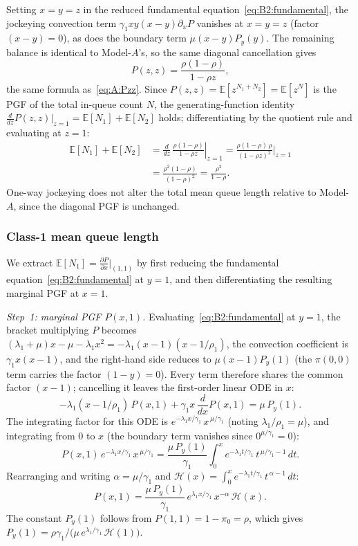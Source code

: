 \documentclass{article}
\numberwithin{equation}{section}
\begin{document}
Setting $x=y=z$ in the reduced fundamental equation~\eqref{eq:B2:fundamental}, the
jockeying convection term $\gamma_1 xy(x-y)\partial_xP$ vanishes at $x=y=z$
(factor $(x-y)=0$), as does the boundary term $\mu(x-y)P_y(y)$.  The remaining
balance is identical to Model-$A$'s, so the same diagonal cancellation gives
\[
    P(z,z) = \frac{\rho(1-\rho)}{1-\rho z},
\]
the same formula as~\eqref{eq:A:Pzz}.  Since $P(z,z)=\mathbb{E}[z^{N_1+N_2}]=\mathbb{E}[z^{N}]$
is the PGF of the total in-queue count $N$, the generating-function identity
$\tfrac{d}{dz}P(z,z)\big|_{z=1}=\mathbb{E}[N_1]+\mathbb{E}[N_2]$ holds;
differentiating by the quotient rule and evaluating at $z=1$:
\begin{align*}
    \mathbb{E}[N_1]+\mathbb{E}[N_2]
    &= \left.\frac{d}{dz}\,\frac{\rho(1-\rho)}{1-\rho z}\right|_{z=1}
     = \frac{\rho(1-\rho)\,\rho}{(1-\rho z)^2}\bigg|_{z=1} \\
    &= \frac{\rho^2(1-\rho)}{(1-\rho)^2}
     = \frac{\rho^2}{1-\rho}.
\end{align*}
One-way jockeying does not alter the total mean queue length relative to
Model-$A$, since the diagonal PGF is unchanged.

\subsubsection*{Class-1 mean queue length}

We extract $\mathbb{E}[N_1]=\tfrac{\partial P}{\partial x}\big|_{(1,1)}$ by first
reducing the fundamental equation~\eqref{eq:B2:fundamental} at $y=1$, and then
differentiating the resulting marginal PGF at $x=1$.

\medskip\noindent\textit{Step~1: marginal PGF $P(x,1)$.}\enspace
Evaluating~\eqref{eq:B2:fundamental} at $y=1$, the bracket multiplying $P$ becomes
$(\lambda_1+\mu)x-\mu-\lambda_1 x^2=-\lambda_1(x-1)(x-1/\rho_1)$, the convection
coefficient is $\gamma_1 x(x-1)$, and the right-hand side reduces to $\mu(x-1)P_y(1)$
(the $\pi(0,0)$ term carries the factor $(1-y)=0$). Every term therefore shares the common
factor $(x-1)$; cancelling it leaves the first-order linear ODE in $x$:
\[
    -\lambda_1(x-1/\rho_1)\,P(x,1) + \gamma_1 x\,\frac{d}{dx}P(x,1) = \mu\,P_y(1).
\]
The integrating factor for this ODE is $e^{-\lambda_1 x/\gamma_1}\,x^{\,\mu/\gamma_1}$
(noting $\lambda_1/\rho_1=\mu$), and integrating from $0$ to $x$ (the boundary term
vanishes since $0^{\mu/\gamma_1}=0$):
\[
    P(x,1)\,e^{-\lambda_1 x/\gamma_1}\,x^{\,\mu/\gamma_1}
    = \frac{\mu\,P_y(1)}{\gamma_1}
    \int_0^x e^{-\lambda_1 t/\gamma_1}\,t^{\,\mu/\gamma_1-1}\,dt.
\]
Rearranging and writing $\alpha=\mu/\gamma_1$ and
$\mathcal{H}(x)=\int_0^x e^{-\lambda_1 t/\gamma_1}\,t^{\,\alpha-1}\,dt$:
\[
    P(x,1) = \frac{\mu\,P_y(1)}{\gamma_1}\,e^{\lambda_1 x/\gamma_1}\,x^{-\alpha}\,\mathcal{H}(x).
\]
The constant $P_y(1)$ follows from $P(1,1)=1-\pi_0=\rho$, which gives
$P_y(1)=\rho\gamma_1/\bigl(\mu\,e^{\lambda_1/\gamma_1}\,\mathcal{H}(1)\bigr)$.
\end{document}
